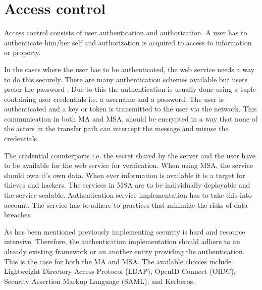 \section{Access control}
\begin{sloppypar}
    Access control consists of user authentication and authorization. A user has
    to authenticate him/her self and authorization is acquired to access to
    information or property.
\end{sloppypar}
\begin{sloppypar}
    In the cases where the user has to be authenticated, the web service needs a
    way to do this securely. There are many authentication schemes available but
    users prefer the password \citep{passwordisdead}. Due to this the
    authentication is usually done using a tuple containing user credentials
    i.e. a username and a password. The user is authenticated and a key or token
    is transmitted to the user via the network. This communication in both MA
    and MSA, should be encrypted in a way that none of the actors in the
    transfer path can intercept the message and misuse the credentials. 
\end{sloppypar}
\begin{sloppypar}
    The credential counterparts i.e. the secret shared by the server and the
    user have to be available for the web service for verification. When using
    MSA, the service should own it's own data. When ever information is
    available it is a target for thieves and hackers. The services in MSA are to
    be individually deployable and the service scalable. Authentication service
    implementation has to take this into account. The service has to adhere to
    practices that minimize the risks of data breaches.
\end{sloppypar}
\begin{sloppypar}
    As has been mentioned previously implementing security is hard and resource
    intensive. Therefore, the authentication implementation should adhere to an
    already existing framework or an another entity providing the
    authentication. This is the case for both the MA and MSA. The available
    choices include Lightweight Directory Access Protocol (LDAP), OpenID Connect
    (OIDC), Security Assertion Markup Language (SAML), and Kerberos.
\end{sloppypar}

